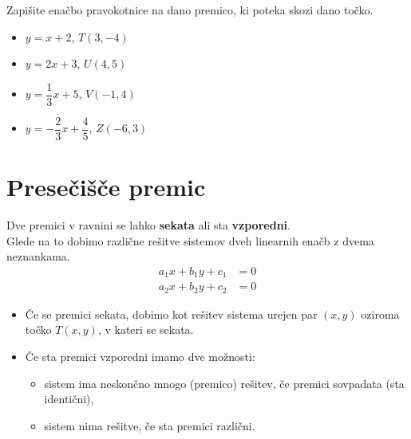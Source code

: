         
            \begin{naloga}
                Zapišite enačbo pravokotnice na dano premico, ki poteka skozi dano točko.
                    \begin{itemize}
                        \item $y=x+2$, $T(3,-4)$ 
                        \item $y=2x+3$, $U(4,5)$ 
                        \item $y=\dfrac{1}{3}x+5$, $V(-1,4)$ 
                        \item $y=-\dfrac{2}{3}x+\dfrac{4}{5}$, $Z(-6,3)$ 

                    \end{itemize}
            \end{naloga}

        





\newpage
    \section{Presečišče premic}

                Dve premici v ravnini se lahko \textbf{sekata} ali sta \textbf{vzporedni}. \\ 
                Glede na to dobimo različne rešitve sistemov dveh linearnih enačb z dvema neznankama.
                $$\begin{aligned}
                    a_1x+b_1y+c_1&=0 \\ a_2x+b_2y+c_2&=0
                \end{aligned}$$
                
                \begin{itemize}
                    \item Če se premici sekata, dobimo kot rešitev sistema urejen par $(x,y)$ oziroma točko $T(x,y)$, v kateri se sekata.
                    \item Če sta premici vzporedni imamo dve možnosti:
                    \begin{itemize}
                        \item sistem ima neskončno mnogo (premico) rešitev, če premici sovpadata (sta identični),
                        \item sistem nima rešitve, če sta premici različni.
                    \end{itemize}
                \end{itemize}

